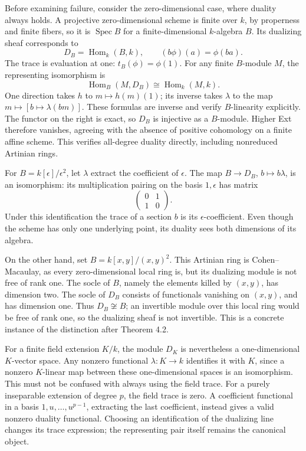 \documentclass[11pt]{article}
\begin{document}
Before examining failure, consider the zero-dimensional case, where
duality always holds. A projective zero-dimensional scheme is finite
over \(k\), by properness and finite fibers, so it is
\(\operatorname{Spec}B\) for a finite-dimensional \(k\)-algebra \(B\).
Its dualizing sheaf corresponds to \[
D_B=\operatorname{Hom}_k(B,k),
\qquad (b\phi)(a)=\phi(ba).
\] The trace is evaluation at one: \(t_B(\phi)=\phi(1)\). For any finite
\(B\)-module \(M\), the representing isomorphism is \[
\operatorname{Hom}_B(M,D_B)\cong\operatorname{Hom}_k(M,k).
\] One direction takes \(h\) to \(m\mapsto h(m)(1)\); its inverse takes
\(\lambda\) to the map \(m\mapsto[b\mapsto\lambda(bm)]\). These formulas
are inverse and verify \(B\)-linearity explicitly. The functor on the
right is exact, so \(D_B\) is injective as a \(B\)-module. Higher Ext
therefore vanishes, agreeing with the absence of positive cohomology on
a finite affine scheme. This verifies all-degree duality directly,
including nonreduced Artinian rings.

For \(B=k[\epsilon]/\epsilon^2\), let \(\lambda\) extract the
coefficient of \(\epsilon\). The map \(B\to D_B\),
\(b\mapsto b\lambda\), is an isomorphism: its multiplication pairing on
the basis \(1,\epsilon\) has matrix \[
\begin{pmatrix}0&1\\1&0\end{pmatrix}.
\] Under this identification the trace of a section \(b\) is its
\(\epsilon\)-coefficient. Even though the scheme has only one underlying
point, its duality sees both dimensions of its algebra.

On the other hand, set \(B=k[x,y]/(x,y)^2\). This Artinian ring is
Cohen--Macaulay, as every zero-dimensional local ring is, but its
dualizing module is not free of rank one. The socle of \(B\), namely the
elements killed by \((x,y)\), has dimension two. The socle of \(D_B\)
consists of functionals vanishing on \((x,y)\), and has dimension one.
Thus \(D_B\not\cong B\); an invertible module over this local ring would
be free of rank one, so the dualizing sheaf is not invertible. This is a
concrete instance of the distinction after Theorem 4.2.

For a finite field extension \(K/k\), the module \(D_K\) is nevertheless
a one-dimensional \(K\)-vector space. Any nonzero functional
\(\lambda:K\to k\) identifies it with \(K\), since a nonzero
\(K\)-linear map between these one-dimensional spaces is an isomorphism.
This must not be confused with always using the field trace. For a
purely inseparable extension of degree \(p\), the field trace is zero. A
coefficient functional in a basis \(1,u,\ldots,u^{p-1}\), extracting the
last coefficient, instead gives a valid nonzero duality functional.
Choosing an identification of the dualizing line changes its trace
expression; the representing pair itself remains the canonical object.
\end{document}
